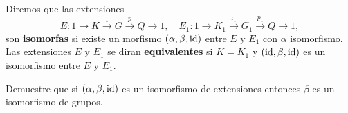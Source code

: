 \begin{definition}
	Diremos que las extensiones 
	\[
	E\colon 1\to K\xrightarrow{\iota}G\xrightarrow{p} Q\to1,
	\quad
	E_1\colon 1\to K_1\xrightarrow{\iota_1}G_1\xrightarrow{p_1} Q\to1,
	\]
	son \textbf{isomorfas} si existe un morfismo $(\alpha,\beta,\operatorname{id})$ entre $E$
	y $E_1$ con $\alpha$ isomorfismo. Las extensiones $E$ y $E_1$ se diran
	\textbf{equivalentes} si $K=K_1$ y $(\operatorname{id},\beta,\operatorname{id})$ es un isomorfismo
	entre $E$ y $E_1$.
\end{definition}

\begin{exercise}
\label{xca:extensiones}
	Demuestre que si $(\alpha,\beta,\operatorname{id})$ es un isomorfismo de extensiones
	entonces $\beta$ es un isomorfismo de grupos.
\end{exercise}


%
%
%
%
%

